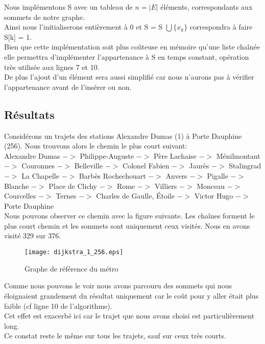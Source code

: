 \documentclass{article}
\begin{document}
Nous implémentons S avec un tableau de $n = \vert E\vert$ éléments, correspondants aux sommets 
de notre graphe.\\
Ainsi nous l'initialiserons entièrement à 0 et S = S $\bigcup \{x_k\}$
correspondra à faire S[k] = 1.\\
Bien que cette implémentation soit plus coûteuse en mémoire qu'une liste chaînée
elle permettra d'implémenter l'appartenance à S en temps constant, opération très
utilisée aux lignes 7 et 10.\\
De plus l'ajout d'un élément sera aussi simplifié car nous n'aurons pas à vérifier
l'appartenance avant de l'insérer ou non.\\

\subsection{Résultats}

Considérons un trajets des stations Alexandre Dumas (1) à Porte Dauphine (256).
Nous trouvons alors le chemin le plus court suivant:\\

Alexandre Dumas
$->$ Philippe-Auguste
$->$ Père Lachaise
$->$ Ménilmontant
$->$ Couronnes
$->$ Belleville
$->$ Colonel Fabien
$->$ Jaurès
$->$ Stalingrad
$->$ La Chapelle
$->$ Barbès Rochechouart
$->$ Anvers
$->$ Pigalle
$->$ Blanche
$->$ Place de Clichy
$->$ Rome
$->$ Villiers
$->$ Monceau
$->$ Courcelles
$->$ Ternes
$->$ Charles de Gaulle, Étoile
$->$ Victor Hugo
$->$ Porte Dauphine\\

Nous pouvons observer ce chemin avec la figure suivante. Les chaînes forment le plus court
chemin et les sommets sont uniquement ceux visités. Nous en avons visité 329 sur 376.\\

\begin{figure}[!hbt]
	\centering
		\texttt{[image: dijkstra\_1\_256.eps]}
	\caption{Graphe de référence du métro}
	\label{dijkstra_1}
\end{figure}

Comme nous pouvons le voir nous avons parcouru des sommets qui nous éloignaient grandement du résultat
uniquement car le coût pour y aller était plus faible (cf ligne 10 de l'algorithme).\\
Cet effet est exacerbé ici car le trajet que nous avons choisi est particulièrement long.\\
Ce constat reste le même sur tous les trajets, sauf sur ceux très courts.\\
\end{document}
